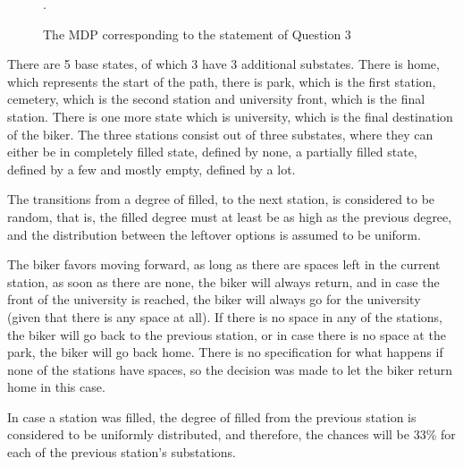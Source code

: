 \documentclass[a4paper]{article}
\begin{document}
\begin{figure}[H]
    \caption{The MDP corresponding to the statement of Question 3}.
    \label{fig:q3}
\end{figure}{}
There are 5 base states, of which 3 have 3 additional substates. There is home, which represents the start of the path, there is park, which is the first station, cemetery, which is the second station and university front, which is the final station. There is one more state which is university, which is the final destination of the biker. The three stations consist out of three substates, where they can either be in completely filled state, defined by none, a partially filled state, defined by a few and mostly empty, defined by a lot.

The transitions from a degree of filled, to the next station, is considered to be random, that is, the filled degree must at least be as high as the previous degree, and the distribution between the leftover options is assumed to be uniform.

The biker favors moving forward, as long as there are spaces left in the current station, as soon as there are none, the biker will always return, and in case the front of the university is reached, the biker will always go for the university (given that there is any space at all). If there is no space in any of the stations, the biker will go back to the previous station, or in case there is no space at the park, the biker will go back home. There is no specification for what happens if none of the stations have spaces, so the decision was made to let the biker return home in this case.

In case a station was filled, the degree of filled from the previous station is considered to be uniformly distributed, and therefore, the chances will be 33\% for each of the previous station's substations.
\end{document}
